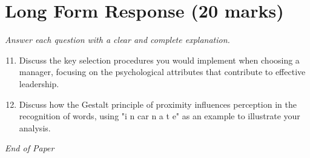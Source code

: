 \documentclass[12pt]{article}
\begin{document}
\section*{Long Form Response (20 marks)}
\textit{Answer each question with a clear and complete explanation.}
\begin{enumerate}[label=\arabic*.]
\setcounter{enumi}{10}
\item Discuss the key selection procedures you would implement when choosing a manager, focusing
on the psychological attributes that contribute to effective leadership.
\item Discuss how the Gestalt principle of proximity influences perception in the recognition of
words, using "i n car n a t e" as an example to illustrate your analysis.
\end{enumerate}

\vfill
\noindent\textit{End of Paper}
\end{document}
